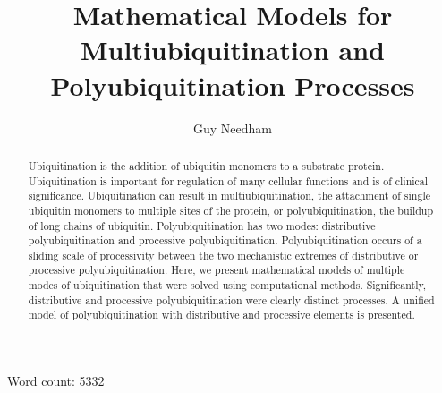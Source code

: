 \documentclass[11pt]{article}
\begin{document}
\title{Mathematical Models for Multiubiquitination and Polyubiquitination Processes}
\author{Guy Needham}
\date{}
\maketitle
\vspace{30mm}
\centerline{Word count: 5332}

\newpage
\vspace*{\fill}
\begin{abstract}
Ubiquitination is the addition of ubiquitin monomers to a substrate protein. Ubiquitination is important for regulation of many cellular functions and is of clinical significance. Ubiquitination can result in multiubiquitination, the attachment of single ubiquitin monomers to multiple sites of the protein, or polyubiquitination, the buildup of long chains of ubiquitin. Polyubiquitination has two modes: distributive polyubiquitination and processive polyubiquitination. Polyubiquitination occurs of a sliding scale of processivity between the two mechanistic extremes of distributive or processive polyubiquitination. Here, we present mathematical models of multiple modes of ubiquitination that were solved using computational methods. Significantly, distributive and processive polyubiquitination were clearly distinct processes. A unified model of polyubiquitination with distributive and processive elements is presented.
\end{abstract}
\vspace*{\fill}

\newpage
\tableofcontents
\newpage
\end{document}
